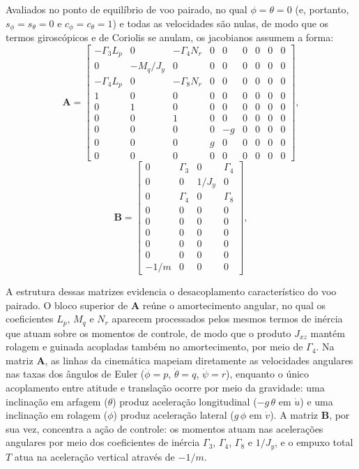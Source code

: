 Avaliados no ponto de equilíbrio de voo pairado, no qual $\phi=\theta=0$ (e, portanto, $s_\phi=s_\theta=0$ e $c_\phi=c_\theta=1$) e todas as velocidades são nulas, de modo que os termos giroscópicos e de Coriolis se anulam, os jacobianos assumem a forma:
\begin{equation}
    \mathbf{A} =
    \begin{bmatrix}
        -\Gamma_3 L_p & 0 & -\Gamma_4 N_r & 0 & 0 & 0 & 0 & 0 & 0 \\
        0 & -M_q/J_y & 0 & 0 & 0 & 0 & 0 & 0 & 0 \\
        -\Gamma_4 L_p & 0 & -\Gamma_8 N_r & 0 & 0 & 0 & 0 & 0 & 0 \\
        1 & 0 & 0 & 0 & 0 & 0 & 0 & 0 & 0 \\
        0 & 1 & 0 & 0 & 0 & 0 & 0 & 0 & 0 \\
        0 & 0 & 1 & 0 & 0 & 0 & 0 & 0 & 0 \\
        0 & 0 & 0 & 0 & -g & 0 & 0 & 0 & 0 \\
        0 & 0 & 0 & g & 0 & 0 & 0 & 0 & 0 \\
        0 & 0 & 0 & 0 & 0 & 0 & 0 & 0 & 0
    \end{bmatrix},
    \label{eq:matrix-A}
\end{equation}
\begin{equation}
    \mathbf{B} =
    \begin{bmatrix}
        0 & \Gamma_3 & 0 & \Gamma_4 \\
        0 & 0 & 1/J_y & 0 \\
        0 & \Gamma_4 & 0 & \Gamma_8 \\
        0 & 0 & 0 & 0 \\
        0 & 0 & 0 & 0 \\
        0 & 0 & 0 & 0 \\
        0 & 0 & 0 & 0 \\
        0 & 0 & 0 & 0 \\
        -1/m & 0 & 0 & 0
    \end{bmatrix},
    \label{eq:matrix-B}
\end{equation}

A estrutura dessas matrizes evidencia o desacoplamento característico do voo pairado. {\color{blue}O bloco superior de $\mathbf{A}$ reúne o amortecimento angular, no qual os coeficientes $L_p$, $M_q$ e $N_r$ aparecem processados pelos mesmos termos de inércia que atuam sobre os momentos de controle, de modo que o produto $J_{xz}$ mantém rolagem e guinada acopladas também no amortecimento, por meio de $\Gamma_4$.} Na matriz $\mathbf{A}$, as linhas da cinemática mapeiam diretamente as velocidades angulares nas taxas dos ângulos de Euler ($\dot\phi=p$, $\dot\theta=q$, $\dot\psi=r$), enquanto o único acoplamento entre atitude e translação ocorre por meio da gravidade: uma inclinação em arfagem ($\theta$) produz aceleração longitudinal ($-g\,\theta$ em $\dot u$) e uma inclinação em rolagem ($\phi$) produz aceleração lateral ($g\,\phi$ em $\dot v$). A matriz $\mathbf{B}$, por sua vez, concentra a ação de controle: os momentos atuam nas acelerações angulares por meio dos coeficientes de inércia $\Gamma_3$, $\Gamma_4$, $\Gamma_8$ e $1/J_y$, e o empuxo total $T$ atua na aceleração vertical através de $-1/m$.

